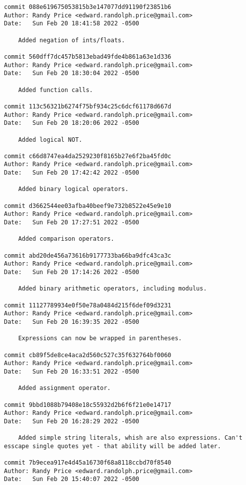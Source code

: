 {\begin{verbatim}
commit 088e619675053815b3e147077dd91190f23851b6
Author: Randy Price <edward.randolph.price@gmail.com>
Date:   Sun Feb 20 18:41:58 2022 -0500

    Added negation of ints/floats.

commit 560dff7dc457b5813ebad49fde4b861a63e1d336
Author: Randy Price <edward.randolph.price@gmail.com>
Date:   Sun Feb 20 18:30:04 2022 -0500

    Added function calls.

commit 113c56321b6274f75bf934c25c6dcf61178d667d
Author: Randy Price <edward.randolph.price@gmail.com>
Date:   Sun Feb 20 18:20:06 2022 -0500

    Added logical NOT.

commit c66d8747ea4da2529230f8165b27e6f2ba45fd0c
Author: Randy Price <edward.randolph.price@gmail.com>
Date:   Sun Feb 20 17:42:42 2022 -0500

    Added binary logical operators.

commit d3662544ee03afba40beef9e732b8522e45e9e10
Author: Randy Price <edward.randolph.price@gmail.com>
Date:   Sun Feb 20 17:27:51 2022 -0500

    Added comparison operators.

commit abd20de456a73616b9177733ba66ba9dfc43ca3c
Author: Randy Price <edward.randolph.price@gmail.com>
Date:   Sun Feb 20 17:14:26 2022 -0500

    Added binary arithmetic operators, including modulus.

commit 11127789934e0f50e78a0484d215f6def09d3231
Author: Randy Price <edward.randolph.price@gmail.com>
Date:   Sun Feb 20 16:39:35 2022 -0500

    Expressions can now be wrapped in parentheses.

commit cb89f5de8ce4aca2d560c527c35f632764bf0060
Author: Randy Price <edward.randolph.price@gmail.com>
Date:   Sun Feb 20 16:33:51 2022 -0500

    Added assignment operator.

commit 9bbd1088b79408e18c55932d2b6f6f21e0e14717
Author: Randy Price <edward.randolph.price@gmail.com>
Date:   Sun Feb 20 16:28:29 2022 -0500

    Added simple string literals, whish are also expressions. Can't esscape single quotes yet - that ability will be added later.

commit 7b9ecea917e4d45a16730f68a8118ccbd70f8540
Author: Randy Price <edward.randolph.price@gmail.com>
Date:   Sun Feb 20 15:40:07 2022 -0500


\end{verbatim}}
